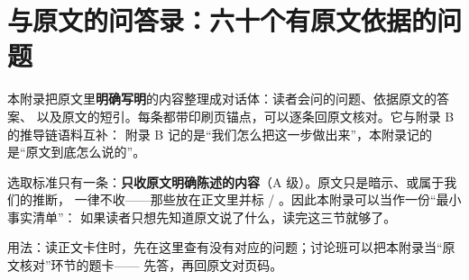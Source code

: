 \section{与原文的问答录：六十个有原文依据的问题}\label{app:dialogue}

本附录把原文里\textbf{明确写明}的内容整理成对话体：读者会问的问题、依据原文的答案、
以及原文的短引。每条都带印刷页锚点，可以逐条回原文核对。它与附录 B 的推导链语料互补：
附录 B 记的是“我们怎么把这一步做出来”，本附录记的是“原文到底怎么说的”。

选取标准只有一条：\textbf{只收原文明确陈述的内容}（A 级）。原文只是暗示、或属于我们的推断，
一律不收——那些放在正文里并标 \pB / \pC。因此本附录可以当作一份“最小事实清单”：
如果读者只想先知道原文说了什么，读完这三节就够了。

用法：读正文卡住时，先在这里查有没有对应的问题；讨论班可以把本附录当“原文核对”环节的题卡——
先答，再回原文对页码。




